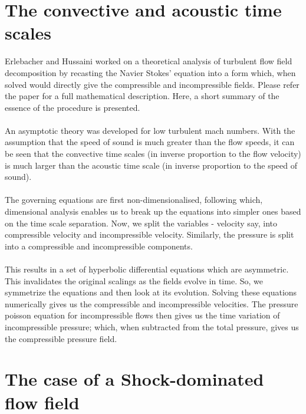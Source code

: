 \documentclass[12pt, a4paper]{report}
\begin{document}
\section{The convective and acoustic time scales}
Erlebacher and Hussaini\cite{erlebacher} worked on a theoretical analysis of turbulent flow field decomposition by recasting the Navier Stokes' equation into a form which, when solved would directly give the compressible and incompressible fields. Please refer the paper for a full mathematical description. Here, a short summary of the essence of the procedure is presented. \\~\\ An asymptotic theory was developed for low turbulent mach numbers. With the assumption that the speed of sound is much greater than the flow speeds, it can be seen that the convective time scales (in inverse proportion to the flow velocity) is much larger than the acoustic time scale (in inverse proportion to the speed of sound).\\~\\
The governing equations are first non-dimensionalised, following which, dimensional analysis enables us to break up the equations into simpler ones based on the time scale separation. Now, we split the variables - velocity say, into compressible velocity and incompressible velocity. Similarly, the pressure is split into a compressible and incompressible components.\\~\\
This results in a set of hyperbolic differential equations which are asymmetric. This invalidates the original scalings as the fields evolve in time. So, we symmetrize the equations and then look at its evolution. Solving these equations numerically gives us the compressible and incompressible velocities. The pressure poisson equation for incompressible flows then gives us the time variation of incompressible pressure; which, when subtracted from the total pressure, gives us the compressible pressure field.

\section{The case of a Shock-dominated flow field}
\end{document}
